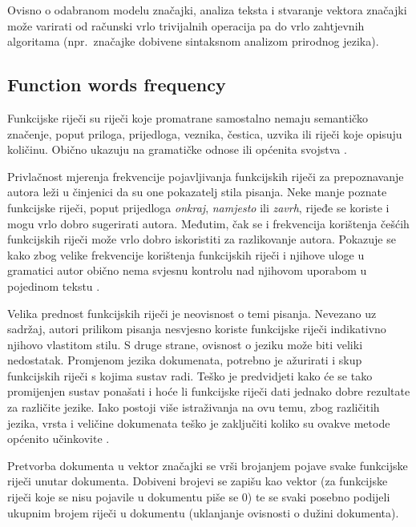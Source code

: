 \documentclass[11pt,english]{article}
\begin{document}
\begin{multicols}{2}

Ovisno o odabranom modelu značajki, analiza teksta i stvaranje vektora značajki
može varirati od računski vrlo trivijalnih operacija pa do vrlo zahtjevnih
algoritama (npr.~značajke dobivene sintaksnom analizom prirodnog jezika).


\subsection{Function words frequency}
\label{sec:funkcijske-rijeci}
Funkcijske riječi su riječi koje promatrane samostalno nemaju semantičko
značenje, poput priloga, prijedloga, veznika, čestica, uzvika ili riječi koje
opisuju količinu. Obično ukazuju na gramatičke odnose ili općenita svojstva
\citep{zhao2005effective}.

Privlačnost mjerenja frekvencije pojavljivanja funkcijskih riječi za
prepoznavanje autora leži u činjenici da su one pokazatelj stila pisanja. Neke
manje poznate funkcijske riječi, poput prijedloga \emph{onkraj},
\emph{namjesto} ili \emph{zavrh}, rijeđe se koriste i mogu vrlo dobro
sugerirati autora. Međutim, čak se i frekvencija korištenja češćih funkcijskih
riječi može vrlo dobro iskoristiti za razlikovanje autora. Pokazuje se kako zbog
velike frekvencije korištenja funkcijskih riječi i njihove uloge u gramatici
autor obično nema svjesnu kontrolu nad njihovom uporabom u pojedinom tekstu
\citep{argamon2005measuring}.

Velika prednost funkcijskih riječi je neovisnost o temi pisanja. Nevezano uz
sadržaj, autori prilikom pisanja nesvjesno koriste funkcijske riječi indikativno
njihovo vlastitom stilu. S druge strane, ovisnost o jeziku može biti veliki
nedostatak. Promjenom jezika dokumenata, potrebno je ažurirati i skup funkcijskih
riječi s kojima sustav radi. Teško je predvidjeti kako će se tako promijenjen
sustav ponašati i hoće li funkcijske riječi dati jednako dobre rezultate za
različite jezike. Iako postoji više istraživanja na ovu temu, zbog različitih
jezika, vrsta i veličine dokumenata teško je zaključiti koliko su ovakve metode
općenito učinkovite \citep{zhao2005effective}.

Pretvorba dokumenta u vektor značajki se vrši brojanjem pojave svake funkcijske
riječi unutar dokumenta. Dobiveni brojevi se zapišu kao vektor (za funkcijske
riječi koje se nisu pojavile u dokumentu piše se 0) te se svaki posebno podijeli
ukupnim brojem riječi u dokumentu (uklanjanje ovisnosti o dužini dokumenta).


\end{multicols}
\end{document}
